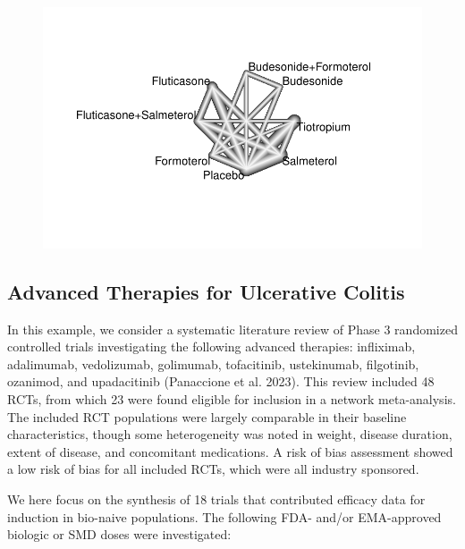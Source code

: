 \documentclass[
  letterpaper,
  DIV=11,
  numbers=noendperiod]{scrreprt}
\begin{document}
\begin{figure}[H]

{\centering \includegraphics{chapter_10_files/figure-pdf/unnamed-chunk-25-1.pdf}

}

\end{figure}

\hypertarget{advanced-therapies-for-ulcerative-colitis}{%
\subsection{Advanced Therapies for Ulcerative
Colitis}\label{advanced-therapies-for-ulcerative-colitis}}

In this example, we consider a systematic literature review of Phase 3
randomized controlled trials investigating the following advanced
therapies: infliximab, adalimumab, vedolizumab, golimumab, tofacitinib,
ustekinumab, filgotinib, ozanimod, and upadacitinib (Panaccione et al.
2023). This review included 48 RCTs, from which 23 were found eligible
for inclusion in a network meta-analysis. The included RCT populations
were largely comparable in their baseline characteristics, though some
heterogeneity was noted in weight, disease duration, extent of disease,
and concomitant medications. A risk of bias assessment showed a low risk
of bias for all included RCTs, which were all industry sponsored.

We here focus on the synthesis of 18 trials that contributed efficacy
data for induction in bio-naive populations. The following FDA- and/or
EMA-approved biologic or SMD doses were investigated:
\end{document}
